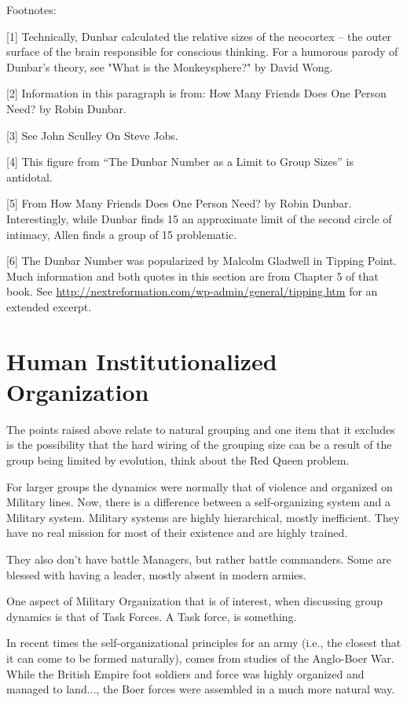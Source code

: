 Footnotes:

[1] Technically, Dunbar calculated the relative sizes of the neocortex – the outer surface of the brain responsible for conscious thinking. For a humorous parody of Dunbar's theory, see "What is the Monkeysphere?" by David Wong.

[2] Information in this paragraph is from: How Many Friends Does One Person Need? by Robin Dunbar.

[3] See John Sculley On Steve Jobs.

[4] This figure from ``The Dunbar Number as a Limit to Group Sizes'' is antidotal.

[5] From How Many Friends Does One Person Need? by Robin Dunbar. Interestingly, while Dunbar finds 15 an approximate limit of the second circle of intimacy, Allen finds a group of 15 problematic.

[6] The Dunbar Number was popularized by Malcolm Gladwell in Tipping Point. Much information and both quotes in this section are from Chapter 5 of that book. See \url{http://nextreformation.com/wp-admin/general/tipping.htm} for an extended excerpt. 

\section{Human Institutionalized Organization}

The points raised above relate to natural grouping and one item that it excludes is the possibility that the hard wiring of the grouping size can be a result of the group being limited by evolution, think about the Red Queen problem.

For larger groups the dynamics were normally that of violence and organized on Military lines. Now, there is a difference between a self-organizing system and a Military system. Military systems are highly hierarchical, mostly inefficient. They have no real mission for most of their existence and are highly trained. 

They also don't have battle Managers, but rather battle commanders. Some are blessed with having a leader, mostly absent in modern armies.

One aspect of Military Organization that is of interest, when discussing group dynamics is that of Task Forces. A Task force, is something.

In recent times the self-organizational principles for an army (i.e., the closest that it can come to be formed naturally), comes from studies of the Anglo-Boer War. While the British Empire foot soldiers and force was highly organized and managed to land..., the Boer forces were assembled in a much more natural way. 

